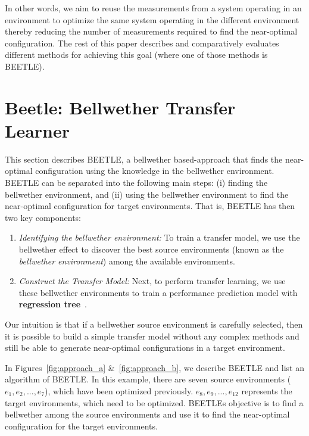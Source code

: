 \documentclass[10pt,journal,compsoc]{IEEEtran}
\newcommand{\be}{\begin{enumerate}}
\newcommand{\ee}{\end{enumerate}}
\begin{document}
In other words, we aim to reuse the measurements from a system operating in an environment to optimize the same system operating in the different environment thereby reducing the number of measurements required to find the near-optimal configuration.
The rest of this paper describes and comparatively evaluates
different methods for achieving this goal (where one of those
methods is  BEETLE).


\section{{\large Beetle: Bellwether Transfer Learner}}
\label{sect:beetle}



This section describes BEETLE, a bellwether based-approach that finds the near-optimal configuration using the knowledge in the bellwether environment. BEETLE can be separated into the following main steps: (i) finding the bellwether environment, and (ii) using the bellwether environment to find the near-optimal configuration for target environments. That is, BEETLE has then two key components:
\be
    \item \textit{Identifying the bellwether environment:} To train a transfer model, we use the bellwether effect to discover the best source environments (known as the \textit{bellwether environment}) among the available environments. 
    
    \item \textit{Construct the Transfer Model:} Next, to perform transfer learning, we use these bellwether environments to train a performance prediction model with \textbf{regression tree}~\cite{breiman1996bagging}.
\ee

Our intuition is that if a bellwether source environment is carefully selected, then it is possible to build a simple transfer model without any complex methods and still be able to generate near-optimal configurations in a target environment. 

In Figures~\ref{fig:approach_a} \&~\ref{fig:approach_b}, we describe BEETLE and list an algorithm of BEETLE. In this example, there are seven source environments ($e_1, e_2,..., e_7$), which have been optimized previously. $e_8, e_9,..., e_{12}$ represents the target environments, which need to be optimized. BEETLE\textquotesingle s objective is to find a bellwether among the source environments and use it to find the near-optimal configuration for the target environments. 
\end{document}
